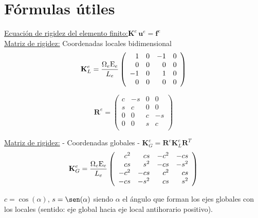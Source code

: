 \newcommand{\mE}{{\rm E}}
\newcommand{\mG}{{\rm G}}

\chapter{Fórmulas útiles}

\begin{center}
\end{center}

\underline{
	Ecuación de rigidez del elemento finito:}\quad $\textbf{K}^e \,\textbf{u}^e = \textbf{f}^e$\\

\underline{
	Matriz de rigidez:} Coordenadas locales bidimensional
%
\vspace{-0.3cm}
$$
\textbf{K}_ L^e= %
\frac{\Omega_e\mE_e}{L_e}
\left(
\begin{array}{rrrr}
1  & 0 & -1 & 0 \\
0  & 0 &  0 & 0 \\
-1 & 0 &  1 & 0 \\
0  & 0 &  0 & 0 \\
\end{array}
\right)
$$

$$
\textbf{R}^e = %
\left(
\begin{array}{rrrr}
c  & -s &  0 & 0 \\
s  & c &  0 & 0 \\
0  & 0 &  c & -s \\
0  & 0 & s & c \\
\end{array}
\right)
$$

\underline{
	Matriz de rigidez:} - Coordenadas globales - $\textbf{K}_ G^e=\textbf{R}^e \textbf{K}_ L^e\textbf{R}^T$
\vspace{-0.3cm}
$$
\textbf{K}_ G^e= %
\frac{\Omega_e\mE_e}{L_e}
\left(
\begin{array}{rrrr}
c^2  & cs   & -c^2 &  -cs \\
cs  & s^2  &  -cs & -s^2 \\
-c^2  & -cs  &  c^2 &   cs \\
-cs  & -s^2 &   cs &  s^2 \\
\end{array}
\right)
$$

\vspace{-0.2cm}
$c=\cos(\alpha)$, $s=\sen(\alpha)$ siendo $\alpha$ el ángulo que forman los ejes globales con los locales (sentido: eje global hacia eje local antihorario positivo).

